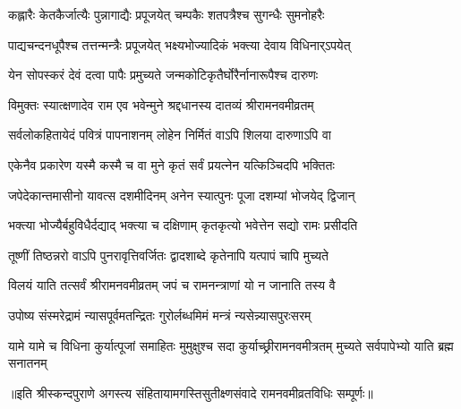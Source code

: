 \twolineshloka
{कह्लारैः केतकैर्जात्यैः पुन्नागाद्यैः प्रपूजयेत्}
{चम्पकैः शतपत्रैश्च सुगन्धैः सुमनोहरैः}%

\twolineshloka
{पाद्यचन्दनधूपैश्च तत्तन्मन्त्रैः प्रपूजयेत्}
{भक्ष्यभोज्यादिकं भक्त्या देवाय विधिनार्ऽपयेत्}%

\twolineshloka
{येन सोपस्करं देवं दत्वा पापैः प्रमुच्यते}
{जन्मकोटिकृतैर्घोरैर्नानारूपैश्च दारुणः}%

\twolineshloka
{विमुक्तः स्यात्क्षणादेव राम एव भवेन्मुने}
{श्रद्दधानस्य दातव्यं श्रीरामनवमीव्रतम्}%

\twolineshloka
{सर्वलोकहितायेदं पवित्रं पापनाशनम्}
{लोहेन निर्मितं वाऽपि शिलया दारुणाऽपि वा}%

\twolineshloka
{एकेनैव प्रकारेण यस्मै कस्मै च वा मुने}
{कृतं सर्वं प्रयत्नेन यत्किञ्चिदपि भक्तितः}%

\twolineshloka
{जपेदेकान्तमासीनो यावत्स दशमीदिनम्}
{अनेन स्यात्पुनः पूजा दशम्यां भोजयेद् द्विजान्}%

\twolineshloka
{भक्त्या भोज्यैर्बहुविधैर्दद्याद् भक्त्या च दक्षिणाम्}
{कृतकृत्यो भवेत्तेन सद्यो रामः प्रसीदति}%

\twolineshloka
{तूष्णीं तिष्ठन्नरो वाऽपि पुनरावृत्तिवर्जितः}
{द्वादशाब्दे कृतेनापि यत्पापं चापि मुच्यते}%
 
\twolineshloka
{विलयं याति तत्सर्वं श्रीरामनवमीव्रतम्}
{जपं च रामनन्त्राणां यो न जानाति तस्य वै}%

\twolineshloka
{उपोष्य संस्मरेद्रामं न्यासपूर्वमतन्द्रितः}
{गुरोर्लब्धमिमं मन्त्रं न्यसेन्न्यासपुरःसरम्}%

\threelineshloka
{यामे यामे च विधिना कुर्यात्पूजां समाहितः}
{मुमुक्षुश्च सदा कुर्याच्छ्रीरामनवमीत्रतम्}
{मुच्यते सर्वपापेभ्यो याति ब्रह्म सनातनम्}%

॥इति श्रीस्कन्दपुराणे अगस्त्य संहितायामगस्तिसुतीक्ष्णसंवादे रामनवमी\-व्रत\-विधिः सम्पूर्णः॥

